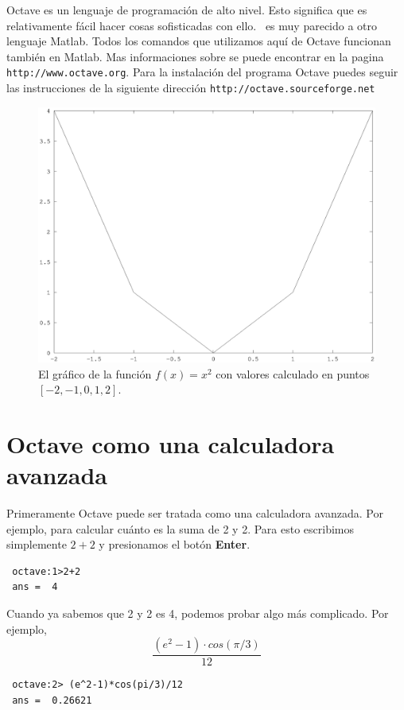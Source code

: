 \cappar Octave es un lenguaje de programación de alto nivel. Esto
significa que es relativamente fácil hacer cosas sofisticadas con
ello.    \Octave\ es muy parecido a otro
lenguaje Matlab. Todos los comandos que utilizamos aquí de Octave
funcionan también en Matlab.
Mas informaciones sobre {\Octave} se puede encontrar en la
pagina
{\tt http://www.octave.org}.
Para la instalación del programa Octave puedes seguir las
instrucciones de la siguiente dirección
{\tt http://octave.sourceforge.net}

\begin{figure} 
  \vspace{-20pt}
  \begin{figurebox}
    \centering
    \includegraphics[width=\textwidth]{fig1.eps}
    \caption{El gráfico de la función $f(x)=x^2$ con valores calculado
      en puntos $[-2,-1,0,1,2]$.  }
    \label{fig:1}
  \end{figurebox}
  \vspace{-120pt}
\end{figure}

\section{Octave como una calculadora avanzada}

Primeramente Octave puede ser tratada como una calculadora
avanzada. Por ejemplo, para calcular cuánto es la suma de 2 y 2. Para
esto escribimos simplemente $2+2$ y presionamos el botón {\bf Enter}.
\begin{octaveboxI}
\begin{verbatim}
 octave:1>2+2
 ans =  4
\end{verbatim}
\end{octaveboxI}
Cuando ya sabemos que 2 y 2 es 4, podemos probar algo más
complicado. Por ejemplo,
\begin{displaymath}
  \frac{(e^2-1)\cdot cos(\pi/3)}{12}  
\end{displaymath}
\begin{octaveboxI}
\begin{verbatim}
 octave:2> (e^2-1)*cos(pi/3)/12
 ans =  0.26621
\end{verbatim}
\end{octaveboxI}




